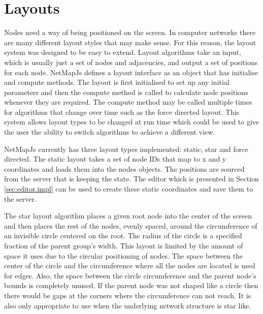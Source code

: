 \documentclass[11pt, a4paper]{report}
\begin{document}
\section{Layouts}
\label{sec:layouts.impl}

Nodes need a way of being positioned on the screen. In computer networks there
are many different layout styles that may make sense. For this reason, the
layout system was designed to be easy to extend. Layout algorithms take an
input, which is usually just a set of nodes and adjacencies, and output a set of
positions for each node. NetMapJs defines a layout interface as an object that
has initialise and compute methods. The layout is first initialised to set up
any initial parameters and then the compute method is called to calculate node
positions whenever they are required. The compute method may be called multiple
times for algorithms that change over time such as the force directed layout.
This system allows layout types to be changed at run time which could be used to
give the user the ability to switch algorithms to achieve a different view.

NetMapJs currently has three layout types implemented: static, star and force
directed. The static layout takes a set of node IDs that map to x and y
coordinates and loads them into the nodes objects. The positions are sourced
from the server that is keeping the state. The editor which is presented in
Section \ref{sec:editor.impl} can be used to create these static coordinates and
save them to the server.

The star layout algorithm places a given root node into the center of the screen
and then places the rest of the nodes, evenly spaced, around the circumference
of an invisible circle centered on the root. The radius of the circle is a
specified fraction of the parent group's width. This layout is limited by the
amount of space it uses due to the circular positioning of nodes. The space
between the center of the circle and the circumference where all the nodes are
located is used for edges. Also, the space between the circle circumference and
the parent node's bounds is completely unused. If the parent node was not shaped
like a circle then there would be gaps at the corners where the circumference
can not reach. It is also only appropriate to use when the underlying network
structure is star like.
\end{document}
